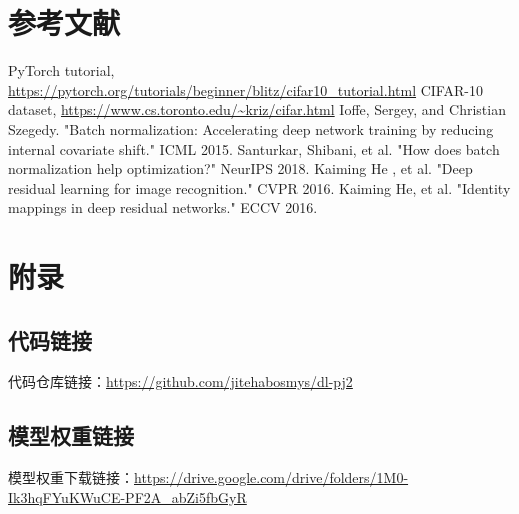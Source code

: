 \documentclass[12pt,a4paper]{article}
\begin{document}
\section{参考文献}
\begin{thebibliography}{9}
 PyTorch tutorial, \url{https://pytorch.org/tutorials/beginner/blitz/cifar10_tutorial.html}
 CIFAR-10 dataset, \url{https://www.cs.toronto.edu/~kriz/cifar.html}
 Ioffe, Sergey, and Christian Szegedy. "Batch normalization: Accelerating deep network training by reducing internal covariate shift." ICML 2015.
 Santurkar, Shibani, et al. "How does batch normalization help optimization?" NeurIPS 2018.
 Kaiming He , et al. "Deep residual learning for image recognition." CVPR 2016.
 Kaiming He, et al. "Identity mappings in deep residual networks." ECCV 2016.
\end{thebibliography}

\section{附录}
\subsection{代码链接}
代码仓库链接：\url{https://github.com/jitehabosmys/dl-pj2}

\subsection{模型权重链接}
模型权重下载链接：\url{https://drive.google.com/drive/folders/1M0-Ik3hqFYuKWuCE-PF2A_abZi5fbGyR}
\end{document}
